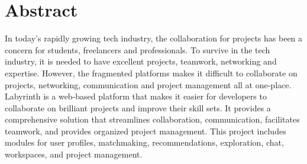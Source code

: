 \documentclass{FastFyp}
\begin{document}
\section*{Abstract}
In today's rapidly growing tech industry, the collaboration for projects has been a concern for students, freelancers and professionals. To survive in the tech industry, it is needed to have excellent projects, teamwork, networking and expertise. However, the fragmented platforms makes it difficult to collaborate on projects, networking, communication and project management all at one-place. Labyrinth is a web-based platform that makes it easier for developers to collaborate on brilliant projects and improve their skill sets. It provides a comprehensive solution that streamlines collaboration, communication, facilitates teamwork, and provides organized project management. This project includes modules for user profiles, matchmaking, recommendations, exploration, chat, workspaces, and project management.
\pagebreak 
\end{document}
